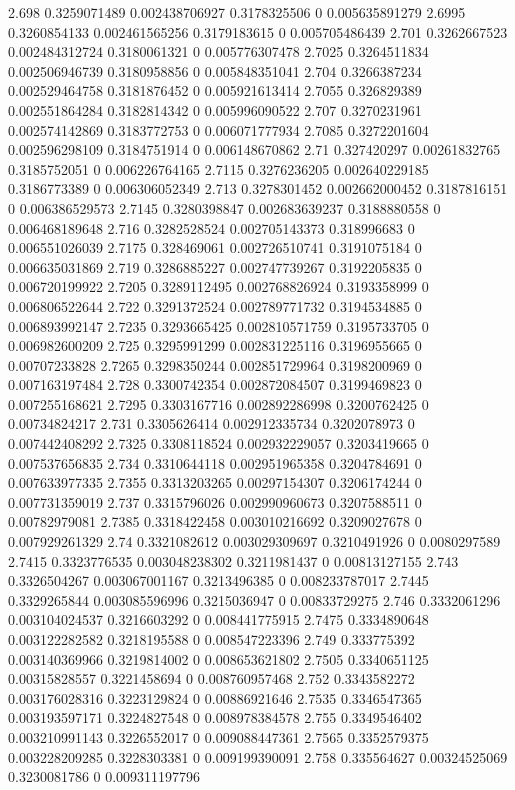 {2.698 0.3259071489 0.002438706927 0.3178325506 0 0.005635891279
2.6995 0.3260854133 0.002461565256 0.3179183615 0 0.005705486439
2.701 0.3262667523 0.002484312724 0.3180061321 0 0.005776307478
2.7025 0.3264511834 0.002506946739 0.3180958856 0 0.005848351041
2.704 0.3266387234 0.002529464758 0.3181876452 0 0.005921613414
2.7055 0.326829389 0.002551864284 0.3182814342 0 0.005996090522
2.707 0.3270231961 0.002574142869 0.3183772753 0 0.006071777934
2.7085 0.3272201604 0.002596298109 0.3184751914 0 0.006148670862
2.71 0.327420297 0.00261832765 0.3185752051 0 0.006226764165
2.7115 0.3276236205 0.002640229185 0.3186773389 0 0.006306052349
2.713 0.3278301452 0.002662000452 0.3187816151 0 0.006386529573
2.7145 0.3280398847 0.002683639237 0.3188880558 0 0.006468189648
2.716 0.3282528524 0.002705143373 0.318996683 0 0.006551026039
2.7175 0.328469061 0.002726510741 0.3191075184 0 0.006635031869
2.719 0.3286885227 0.002747739267 0.3192205835 0 0.006720199922
2.7205 0.3289112495 0.002768826924 0.3193358999 0 0.006806522644
2.722 0.3291372524 0.002789771732 0.3194534885 0 0.006893992147
2.7235 0.3293665425 0.002810571759 0.3195733705 0 0.006982600209
2.725 0.3295991299 0.002831225116 0.3196955665 0 0.00707233828
2.7265 0.3298350244 0.002851729964 0.3198200969 0 0.007163197484
2.728 0.3300742354 0.002872084507 0.3199469823 0 0.007255168621
2.7295 0.3303167716 0.002892286998 0.3200762425 0 0.00734824217
2.731 0.3305626414 0.002912335734 0.3202078973 0 0.007442408292
2.7325 0.3308118524 0.002932229057 0.3203419665 0 0.007537656835
2.734 0.3310644118 0.002951965358 0.3204784691 0 0.007633977335
2.7355 0.3313203265 0.00297154307 0.3206174244 0 0.007731359019
2.737 0.3315796026 0.002990960673 0.3207588511 0 0.00782979081
2.7385 0.3318422458 0.003010216692 0.3209027678 0 0.007929261329
2.74 0.3321082612 0.003029309697 0.3210491926 0 0.0080297589
2.7415 0.3323776535 0.003048238302 0.3211981437 0 0.00813127155
2.743 0.3326504267 0.003067001167 0.3213496385 0 0.008233787017
2.7445 0.3329265844 0.003085596996 0.3215036947 0 0.00833729275
2.746 0.3332061296 0.003104024537 0.3216603292 0 0.008441775915
2.7475 0.3334890648 0.003122282582 0.3218195588 0 0.008547223396
2.749 0.333775392 0.003140369966 0.3219814002 0 0.008653621802
2.7505 0.3340651125 0.00315828557 0.3221458694 0 0.008760957468
2.752 0.3343582272 0.003176028316 0.3223129824 0 0.00886921646
2.7535 0.3346547365 0.003193597171 0.3224827548 0 0.008978384578
2.755 0.3349546402 0.003210991143 0.3226552017 0 0.009088447361
2.7565 0.3352579375 0.003228209285 0.3228303381 0 0.009199390091
2.758 0.335564627 0.00324525069 0.3230081786 0 0.009311197796
}
